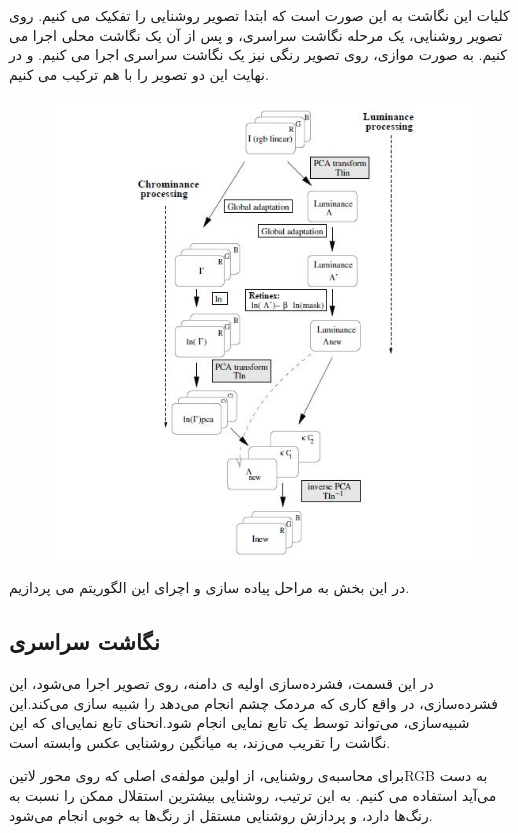 کلیات این نگاشت به این صورت است که ابتدا تصویر روشنایی را تفکیک می کنیم. روی تصویر روشنایی، یک مرحله نگاشت سراسری، و پس از آن یک نگاشت محلی اجرا می کنیم. به صورت موازی، روی تصویر رنگی نیز یک نگاشت سراسری اجرا می کنیم. و در نهایت این دو تصویر را با هم ترکیب می کنیم.
\begin{figure}[!htb]
	\includegraphics[width=\linewidth]{images/retinexbigpic}
	\caption{}\label{fig:logtonemap}
	\endminipage\hfill
\end{figure}

در این بخش به مراحل پیاده سازی و اچرای این الگوریتم می پردازیم.

\subsection{نگاشت سراسری}
در این قسمت، فشرده‌سازی اولیه ی دامنه، روی تصویر اجرا می‌شود، این فشرده‌سازی، در واقع کاری که مردمک چشم انجام می‌دهد را شبیه سازی می‌کند.این شبیه‌سازی، می‌تواند توسط یک تابع نمایی انجام شود.انحنا‌ی تابع نمایی‌ای که این نگاشت را تقریب می‌زند، به میانگین روشنایی عکس وابسته است.

برای محاسبه‌ی روشنایی، از اولین مولفه‌ی اصلی که روی محور 
‌لاتین{RGB }
 به دست می‌آید استفاده می کنیم. به این ترتیب، روشنایی بیشترین استقلال ممکن را نسبت به رنگ‌ها دارد، و پردازش روشنایی مستقل از رنگ‌ها به خوبی انجام می‌شود.
 
